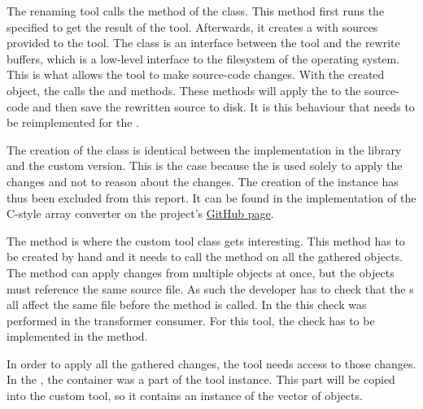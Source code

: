 The renaming tool calls the  method of the  class. This method first runs the specified  to get the result of the tool. Afterwards, it creates a  with sources provided to the tool. The  class is an interface between the tool and the rewrite buffers, which is a low-level interface to the filesystem of the operating system.
This  is what allows the tool to make source-code changes. With the created  object, the  calls the  and  methods. These methods will apply the  to the source-code and then save the rewritten source to disk. It is this behaviour that needs to be reimplemented for the .

The creation of the  class is identical between the implementation in the library and the custom version. This is the case because the  is used solely to apply the changes and not to reason about the changes. The creation of the  instance has thus been excluded from this report. It can be found in the implementation of the C-style array converter on the project's
\href{https://github.com/mortenhaahr/RD/blob/main/examples/c_style_array_converter/c_style_array_converter_tool.cpp}{GitHub page}.

The  method is where the custom tool class gets interesting. This method has to be created by hand and it needs to call the  method on all the gathered  objects. The  method can apply changes from multiple  objects at once, but the objects must reference the same source file.
As such the developer has to check that the s all affect the same file before the  method is called. 
In the  this check was performed in the transformer consumer. 
For this tool, the check has to be implemented in the  method.

In order to apply all the gathered changes, the tool needs access to those changes. In the , the  container was a part of the tool instance. This part will be copied into the custom tool, so it contains an instance of the vector of  objects. 

